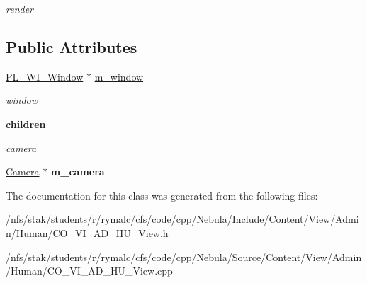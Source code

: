 \begin{DoxyCompactItemize}
\begin{DoxyCompactList}\small\item\em render \item\end{DoxyCompactList}\end{DoxyCompactItemize}
\subsection*{Public Attributes}
\begin{DoxyCompactItemize}
\item 
\hypertarget{classContent_1_1View_1_1Admin_1_1Human_1_1View_aeedce77acda39a55d3db491433fc694e}{
\hyperlink{classPlatform_1_1Window_1_1Window}{PL\_\-WI\_\-Window} $\ast$ \hyperlink{classContent_1_1View_1_1Admin_1_1Human_1_1View_aeedce77acda39a55d3db491433fc694e}{m\_\-window}}
\label{classContent_1_1View_1_1Admin_1_1Human_1_1View_aeedce77acda39a55d3db491433fc694e}

\begin{DoxyCompactList}\small\item\em window \item\end{DoxyCompactList}\end{DoxyCompactItemize}
\begin{Indent}{\bf children}\par
{\em \label{_amgrp268184c12df027f536154d099d497b31}
 camera }\begin{DoxyCompactItemize}
\item 
\hypertarget{classContent_1_1View_1_1Admin_1_1Human_1_1View_a3946289d186fcc7677a200e61617c322}{
\hyperlink{classContent_1_1Camera}{Camera} $\ast$ {\bfseries m\_\-camera}}
\label{classContent_1_1View_1_1Admin_1_1Human_1_1View_a3946289d186fcc7677a200e61617c322}

\end{DoxyCompactItemize}
\end{Indent}


The documentation for this class was generated from the following files:\begin{DoxyCompactItemize}
\item 
/nfs/stak/students/r/rymalc/cfs/code/cpp/Nebula/Include/Content/View/Admin/Human/CO\_\-VI\_\-AD\_\-HU\_\-View.h\item 
/nfs/stak/students/r/rymalc/cfs/code/cpp/Nebula/Source/Content/View/Admin/Human/CO\_\-VI\_\-AD\_\-HU\_\-View.cpp\end{DoxyCompactItemize}
